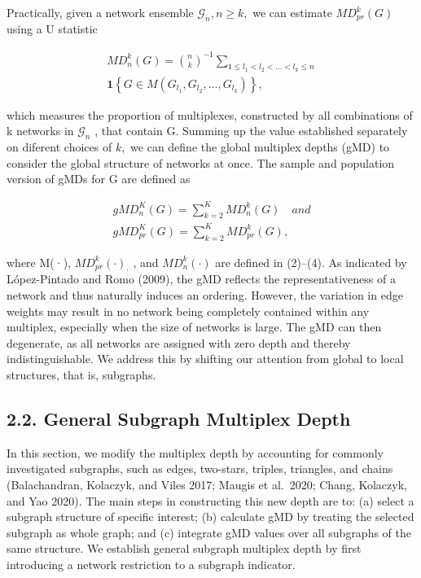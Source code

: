 \documentclass[
  10
]{article}
\begin{document}
Practically, given a network ensemble
\({ \mathcal { G } } _ { n } , n \geq k ,\) we can estimate
\(M D _ { p r } ^ { k } ( G )\) using a U statistic

\[
\begin{array}{c} M D _ {n} ^ {k} (G) = \binom {n} {k} ^ {- 1} \sum_ {1 \leq l _ {1} <   l _ {2} <   \dots <   l _ {k} \leq n} \\ \mathbf {1} \left\{G \in M \left(G _ {l _ {1}}, G _ {l _ {2}}, \ldots , G _ {l _ {k}}\right) \right\}, \end{array}\tag{4}
\]

which measures the proportion of multiplexes, constructed by all
combinations of k networks in \({ \mathcal { G } } _ { n }\) , that
contain G. Summing up the value established separately on diferent
choices of \(k ,\) we can define the global multiplex depths (gMD) to
consider the global structure of networks at once. The sample and
population version of gMDs for G are defined as

\[
\begin{array}{l} g M D _ {n} ^ {K} (G) = \sum_ {k = 2} ^ {K} M D _ {n} ^ {k} (G) \quad a n d \\ g M D _ {p r} ^ {K} (G) = \sum_ {k = 2} ^ {K} M D _ {p r} ^ {k} (G), \end{array}\tag{5}
\]

where M(·), \(M D _ { p r } ^ { k } ( \cdot ) _ { \cdot }\) , and
\(M D _ { n } ^ { k } ( \cdot )\) are defined in (2)--(4). As indicated
by López-Pintado and Romo (2009), the gMD reflects the
representativeness of a network and thus naturally induces an ordering.
However, the variation in edge weights may result in no network being
completely contained within any multiplex, especially when the size of
networks is large. The gMD can then degenerate, as all networks are
assigned with zero depth and thereby indistinguishable. We address this
by shifting our attention from global to local structures, that is,
subgraphs.

\subsection{2.2. General Subgraph Multiplex
Depth}\label{general-subgraph-multiplex-depth}

In this section, we modify the multiplex depth by accounting for
commonly investigated subgraphs, such as edges, two-stars, triples,
triangles, and chains (Balachandran, Kolaczyk, and Viles 2017; Maugis et
al.~2020; Chang, Kolaczyk, and Yao 2020). The main steps in constructing
this new depth are to: (a) select a subgraph structure of specific
interest; (b) calculate gMD by treating the selected subgraph as whole
graph; and (c) integrate gMD values over all subgraphs of the same
structure. We establish general subgraph multiplex depth by first
introducing a network restriction to a subgraph indicator.
\end{document}
